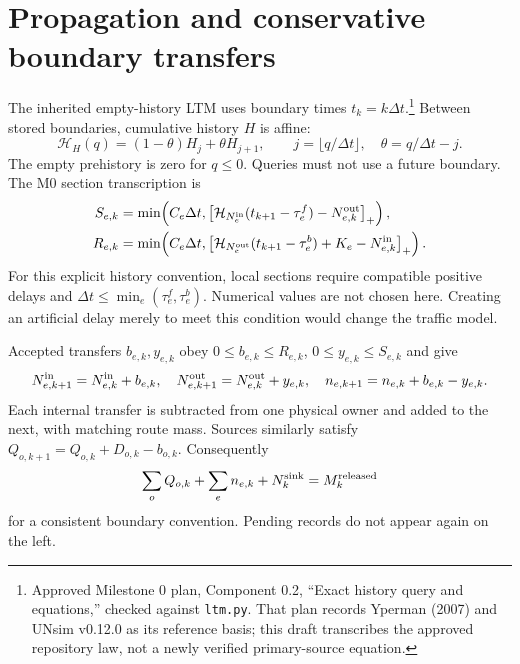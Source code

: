 \documentclass[11pt]{article}
\newcommand{\pos}[1]{\left[#1\right]_+}
\begin{document}
\section{Propagation and conservative boundary transfers}

The inherited empty-history LTM uses boundary times $t_k=k\Delta t$.\footnote{Approved Milestone 0 plan, Component 0.2, ``Exact history query and equations,'' checked against \texttt{ltm.py}. That plan records Yperman (2007) and UNsim v0.12.0 as its reference basis; this draft transcribes the approved repository law, not a newly verified primary-source equation.} Between stored boundaries, cumulative history $H$ is affine:
\begin{equation}
 \mathcal H_H(q)=(1-\theta)H_j+\theta H_{j+1},\qquad
 j=\lfloor q/\Delta t\rfloor,\quad \theta=q/\Delta t-j.
 \label{eq:history}
\end{equation}
The empty prehistory is zero for $q\leq0$. Queries must not use a future boundary. The M0 section transcription is
\begin{align}
 S_{e,k}&=\min\!\left(C_e\Delta t,
  \pos{\mathcal H_{N^{\rm in}_e}(t_{k+1}-\tau^f_e)-N^{\rm out}_{e,k}}\right),
  \label{eq:sending}\\
 R_{e,k}&=\min\!\left(C_e\Delta t,
  \pos{\mathcal H_{N^{\rm out}_e}(t_{k+1}-\tau^b_e)+K_e-N^{\rm in}_{e,k}}\right).
  \label{eq:receiving}
\end{align}
For this explicit history convention, local sections require compatible positive delays and $\Delta t\leq\min_e(\tau^f_e,\tau^b_e)$. Numerical values are not chosen here. Creating an artificial delay merely to meet this condition would change the traffic model.

Accepted transfers $b_{e,k},y_{e,k}$ obey $0\leq b_{e,k}\leq R_{e,k}$, $0\leq y_{e,k}\leq S_{e,k}$ and give
\begin{equation}
 N^{\rm in}_{e,k+1}=N^{\rm in}_{e,k}+b_{e,k},\quad
 N^{\rm out}_{e,k+1}=N^{\rm out}_{e,k}+y_{e,k},\quad
 n_{e,k+1}=n_{e,k}+b_{e,k}-y_{e,k}.
 \label{eq:update}
\end{equation}
Each internal transfer is subtracted from one physical owner and added to the next, with matching route mass. Sources similarly satisfy $Q_{o,k+1}=Q_{o,k}+D_{o,k}-b_{o,k}$. Consequently
\begin{equation}
 \sum_o Q_{o,k}+\sum_e n_{e,k}+N^{\rm sink}_k
 =M^{\rm released}_k
 \label{eq:conservation}
\end{equation}
for a consistent boundary convention. Pending records do not appear again on the left.
\end{document}
